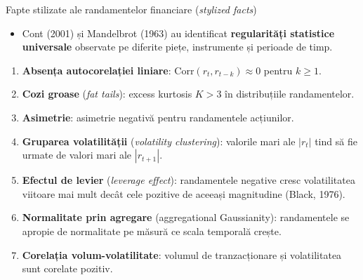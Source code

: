\documentclass[9pt, aspectratio=169, t]{beamer}
\theoremstyle{definition}
\newcommand{\Corr}{\text{Corr}}
\begin{document}
\begin{frame}{Fapte stilizate ale randamentelor financiare (\textit{stylized facts})}
\begin{itemize}
    \item Cont (2001) și Mandelbrot (1963) au identificat \textbf{regularități statistice universale} observate pe diferite piețe, instrumente și perioade de timp.
\end{itemize}
\vspace{0.15cm}
\begin{enumerate}
    \item \textbf{Absența autocorelației liniare}: $\Corr(r_t, r_{t-k}) \approx 0$ pentru $k \geq 1$.
    \item \textbf{Cozi groase} (\textit{fat tails}): excess kurtosis $K > 3$ în distribuțiile randamentelor.
    \item \textbf{Asimetrie}: asimetrie negativă pentru randamentele acțiunilor.
    \item \textbf{Gruparea volatilității} (\textit{volatility clustering}): valorile mari ale $|r_t|$ tind să fie urmate de valori mari ale $|r_{t+1}|$.
    \item \textbf{Efectul de levier} (\textit{leverage effect}): randamentele negative cresc volatilitatea viitoare mai mult decât cele pozitive de aceeași magnitudine (Black, 1976).
    \item \textbf{Normalitate prin agregare} (aggregational Gaussianity): randamentele se apropie de normalitate pe măsură ce scala temporală crește.
    \item \textbf{Corelația volum-volatilitate}: volumul de tranzacționare și volatilitatea sunt corelate pozitiv.
\end{enumerate}
\end{frame}
\end{document}
